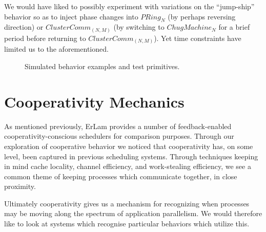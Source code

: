 We would have liked to possibly experiment with variations on the ``jump-ship''
behavior so as to inject phase changes into $PRing_N$ (by perhaps reversing
direction) or $ClusterComm_{(N,M)}$ (by switching to $ChugMachine_N$ for a 
brief period before returning to $ClusterComm_{(N,M)}$). Yet time constraints
have limited us to the aforementioned.

\begin{figure}
\hfill
{}

\hfill
{}

\hfill
{}
\caption{Simulated behavior examples and test primitives.}
\end{figure}


\section{Cooperativity Mechanics}\label{sec:cooperativity mechanics}

As mentioned previously, ErLam provides a number of feedback-enabled 
cooperativity-conscious schedulers for comparison purposes. Through our 
exploration of cooperative behavior we noticed that
cooperativity has, on some level, been captured in previous scheduling systems.
Through techniques keeping in mind cache locality, channel efficiency,
and work-stealing efficiency, we see a common theme of keeping processes which
communicate together, in close proximity. 

Ultimately cooperativity gives us a mechanism for recognizing when processes 
may be moving along the spectrum of application parallelism. We would therefore 
like to look at systems which recognise particular behaviors which utilize this.

